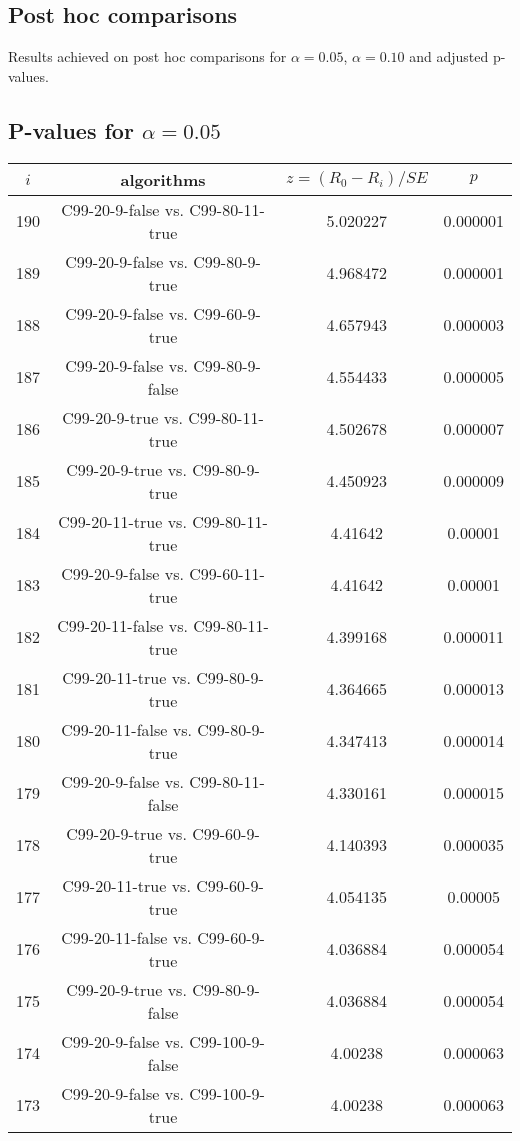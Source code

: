 \documentclass[a4paper,10pt]{article}
\begin{document}
\begin{landscape}
\pagebreak

\section{Post hoc comparisons}

Results achieved on post hoc comparisons for $\alpha = 0.05$, $\alpha = 0.10$ and adjusted p-values.

\subsection{P-values for $\alpha=0.05$}

\begin{table}[!htp]
\centering\scriptsize
\begin{tabular}{cccc}
$i$&algorithms&$z=(R_0 - R_i)/SE$&$p$\\
\hline190&C99-20-9-false vs. C99-80-11-true&5.020227&0.000001\\
189&C99-20-9-false vs. C99-80-9-true&4.968472&0.000001\\
188&C99-20-9-false vs. C99-60-9-true&4.657943&0.000003\\
187&C99-20-9-false vs. C99-80-9-false&4.554433&0.000005\\
186&C99-20-9-true vs. C99-80-11-true&4.502678&0.000007\\
185&C99-20-9-true vs. C99-80-9-true&4.450923&0.000009\\
184&C99-20-11-true vs. C99-80-11-true&4.41642&0.00001\\
183&C99-20-9-false vs. C99-60-11-true&4.41642&0.00001\\
182&C99-20-11-false vs. C99-80-11-true&4.399168&0.000011\\
181&C99-20-11-true vs. C99-80-9-true&4.364665&0.000013\\
180&C99-20-11-false vs. C99-80-9-true&4.347413&0.000014\\
179&C99-20-9-false vs. C99-80-11-false&4.330161&0.000015\\
178&C99-20-9-true vs. C99-60-9-true&4.140393&0.000035\\
177&C99-20-11-true vs. C99-60-9-true&4.054135&0.00005\\
176&C99-20-11-false vs. C99-60-9-true&4.036884&0.000054\\
175&C99-20-9-true vs. C99-80-9-false&4.036884&0.000054\\
174&C99-20-9-false vs. C99-100-9-false&4.00238&0.000063\\
173&C99-20-9-false vs. C99-100-9-true&4.00238&0.000063\\

\end{tabular}
\end{table}
\end{landscape}
\end{document}
